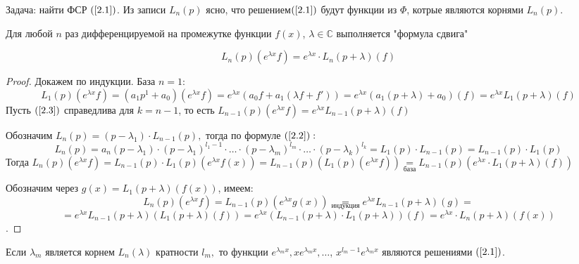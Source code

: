 Задача: найти ФСР $(\ref{2.1})$. Из записи $L_n(p)$ ясно, что решением$ (\ref{2.1})$ будут функции из $\varPhi$, котрые являются корнями $L_n(p)$.
\begin{lemma}
    Для любой $n$ раз дифференцируемой на промежутке функции $f(x)$, $\lambda\in\mathds{C}$ выполняется "формула сдвига"

    \begin{equation}
        \tag{2.3}
        \label{2.3}
        L_n(p)(e^{\lambda x}f)=e^{\lambda x}\cdot L_n(p+\lambda)(f)
    \end{equation}  
\end{lemma}

\begin{proof}
    Докажем по индукции. База $n=1$: $$L_1(p)(e^{\lambda x}f)=(a_1p^1+a_0)(e^{\lambda x}f)=e^{\lambda x}(a_0f+a_1(\lambda f+ f'))=e^{\lambda x}(a_1(p+\lambda)+a_0)(f)=e^{\lambda x}L_1(p+\lambda)(f)$$
    Пусть $(\ref{2.3})$ справедлива для $k=n-1$, то есть $L_{n-1}(p)(e^{\lambda x} f)=e^{\lambda x} L_{n-1}(p+\lambda)(f)$\par
    Обозначим $L_n(p)=(p-\lambda_1)\cdot L_{n-1}(p),$ тогда по формуле $(\ref{2.2}):$
    $$L_n(p)=a_n(p-\lambda_1)\cdot (p-\lambda_1)^{l_1-1}\cdot \dots\cdot (p-\lambda_m)^{l_m} \cdot \dots \cdot (p-\lambda_k)^{l_k}=L_1(p)\cdot L_{n-1}(p)=L_{n-1}(p)\cdot L_1(p)$$
    Тогда $L_n(p)(e^{\lambda x }f) = L_{n-1}(p) \cdot L_1(p)(e^{\lambda x}f(x))=L_{n-1}(p)(L_1(p)(e^{\lambda x}f))\underset{\text{база}}{=} L_{n-1}(p)(e^{\lambda x}\cdot L_1(p+\lambda) (f))$\par
    Обозначим через $g(x)=L_1(p+\lambda)(f(x))$, имеем:
    $$L_n(p)(e^{\lambda x}f) = L_{n-1}(p)(e^{\lambda x}g(x))\underset{\text{индукция}}{=}e^{\lambda x}L_{n-1}(p+\lambda)(g) = $$ $$ = e^{\lambda x}L_{n-1}(p+\lambda)(L_1(p+\lambda)(f))=e^{\lambda x}(L_{n-1}(p+\lambda)\cdot L_{1}(p+\lambda))(f)=e^{\lambda x}\cdot L_n(p+\lambda)(f(x))$$.
\end{proof}

\begin{theorem}
    Если $\lambda_m$ является корнем $L_n(\lambda)$ кратности $l_m,$ то функции $e^{\lambda_m x}, xe^{\lambda_m x}, \dots$, $x^{l_m-1}e^{\lambda_m x}$ являются решениями $(\ref{2.1})$.
\end{theorem}

